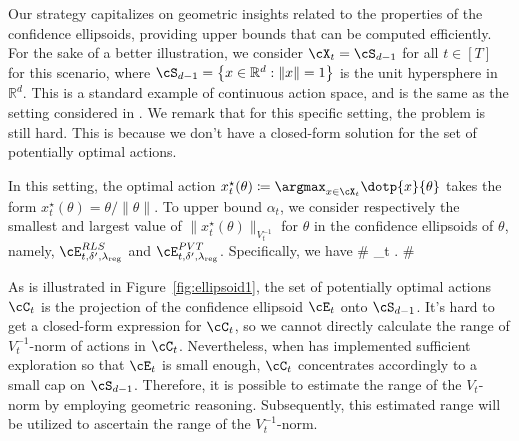 
Our strategy capitalizes on geometric insights related to the properties of the confidence ellipsoids, providing upper bounds that can be computed efficiently.  For the sake of a better illustration, we consider 
 $\cX_t = \cS_{d-1}$ for all $t\in[T]$ for this scenario, where $\cS_{d-1} =\left\{x \in \mathbb{R}^d:\|x\|=1\right\}$ is the unit hypersphere in $\mathbb{R}^d$. This is a standard example of continuous action space, and is the same as the setting considered in \cite{abeille2017linear}. We remark that for this specific setting, the problem is still hard. This is because we don't have a closed-form solution for the set of potentially optimal actions.
 
 In this setting, the optimal action $x_t^\star(\theta )  \coloneqq \argmax_{x\in \cX_t} \dotp{x}{\theta}$ takes the form $ x^\star_t(\theta ) = \theta/\|\theta\|$. To upper bound $\alpha_t$, we consider respectively the smallest and largest value of $\|x^\star_t(\theta)\|_{V_t^{-1}}$ for $\theta$ in the confidence ellipsoids of $\theta$, namely, $\cE^{\RLS}_{t,\delta^\prime, \lambdareg}$ and $\cE^{\PVT}_{t,\delta^\prime, \lambdareg}$. Specifically, we have 
  \# \label{eq:alpha_hat_raw}
 \alpha_t \leq {}.
 \#
 

 
As is illustrated in Figure~\ref{fig:ellipsoid1}, the set of potentially optimal actions $\cC_t$ is the projection of the confidence ellipsoid $\cE_t$  onto $\cS_{d-1}$. It's hard to get a closed-form expression for $\cC_t$, so we cannot directly calculate the range of $V_t^{-1}$-norm of actions in $\cC_t$. Nevertheless, when \POFUL{} has implemented sufficient exploration so that $\cE_t$ is small enough, $\cC_t$ concentrates accordingly to a small cap on $\cS_{d-1}$. Therefore, it is possible to estimate the range of the $V_t$-norm by employing geometric reasoning. Subsequently, this estimated range will be utilized to ascertain the range of the $V_t^{-1}$-norm.






